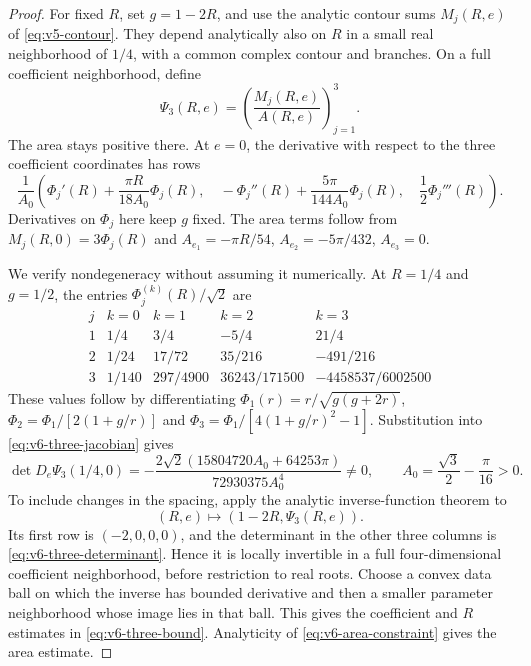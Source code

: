 \begin{proof}
For fixed $R$, set $g=1-2R$, and use the analytic contour sums
$M_j(R,e)$ of \eqref{eq:v5-contour}. They depend analytically also on
$R$ in a small real neighborhood of $1/4$, with a common complex
contour and branches. On a full coefficient neighborhood, define
\[
 \Psi_3(R,e)=\left(\frac{M_j(R,e)}{A(R,e)}\right)_{j=1}^3.
\]
The area stays positive there. At $e=0$, the derivative with respect
to the three coefficient coordinates has rows
\begin{equation}\label{eq:v6-three-jacobian}
 \frac1{A_0}\left(
 \Phi_j'(R)+\frac{\pi R}{18A_0}\Phi_j(R),\quad
 -\Phi_j''(R)+\frac{5\pi}{144A_0}\Phi_j(R),\quad
 \frac12\Phi_j'''(R)\right).
\end{equation}
Derivatives on $\Phi_j$ here keep $g$ fixed. The area terms follow
from $M_j(R,0)=3\Phi_j(R)$ and
$A_{e_1}=-\pi R/54$, $A_{e_2}=-5\pi/432$, $A_{e_3}=0$.

We verify nondegeneracy without assuming it numerically. At $R=1/4$
and $g=1/2$, the entries $\Phi_j^{(k)}(R)/\sqrt2$ are
\[
 \begin{array}{c|rrrr}
 j&k=0&k=1&k=2&k=3\\ \hline
 1&1/4&3/4&-5/4&21/4\\
 2&1/24&17/72&35/216&-491/216\\
 3&1/140&297/4900&36243/171500&-4458537/6002500
 \end{array}
\]
These values follow by differentiating
$\Phi_1(r)=r/\sqrt{g(g+2r)}$,
$\Phi_2=\Phi_1/[2(1+g/r)]$ and
$\Phi_3=\Phi_1/[4(1+g/r)^2-1]$.
Substitution into \eqref{eq:v6-three-jacobian} gives
\begin{equation}\label{eq:v6-three-determinant}
 \det D_e\Psi_3(1/4,0)=
 -\frac{2\sqrt2(15804720 A_0+64253\pi)}{72930375 A_0^4}\ne0,
 \qquad A_0=\frac{\sqrt3}{2}-\frac{\pi}{16}>0.
\end{equation}
To include changes in the spacing, apply the analytic inverse-function
theorem to
\[
 (R,e)\longmapsto(1-2R,\Psi_3(R,e)).
\]
Its first row is $(-2,0,0,0)$, and the determinant in the other three
columns is \eqref{eq:v6-three-determinant}. Hence it is locally
invertible in a full four-dimensional coefficient neighborhood, before
restriction to real roots. Choose a convex data ball on which the
inverse has bounded derivative and then a smaller parameter neighborhood
whose image lies in that ball. This gives the coefficient and $R$
estimates in \eqref{eq:v6-three-bound}. Analyticity of
\eqref{eq:v6-area-constraint} gives the area estimate.


\end{proof}
